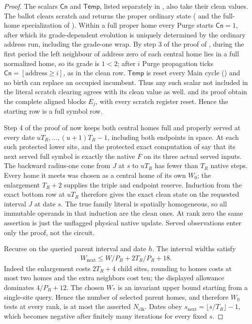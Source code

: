 \begin{proof}
The scalars \(\mathsf{Cn}\) and \(\mathsf{Temp}\), listed separately in \cite[Section~\ref*{cl:sec:native}]{DMNoise1D2026}, also take their clean values. The ballot clears scratch and returns the proper ordinary state (\cite[Section~\ref*{cl:sec:verifier}]{DMNoise1D2026} and the full-home specialization of \cite[Lemma~\ref*{cl:lem:endpoint}]{DMNoise1D2026}). Within a full proper home every Purge starts \(\mathsf{Cn}=1\), after which its grade-dependent evolution is uniquely determined by the ordinary address run, including the grade-one wrap. By step 3 of the proof of \cite[Lemma~\ref*{cl:lem:two-period}]{DMNoise1D2026}, during the first period the left neighbour of address zero of each central home lies in a full normalized home, so its grade is \(1 < 2\); after \(i\) Purge propagation ticks \(\mathsf{Cn}=[\mathrm{address} \ge i]\), as in the clean row. \(\mathsf{Temp}\) is reset every Main cycle (\cite[Section~\ref*{cl:sec:clock}]{DMNoise1D2026}) and no birth can replace an occupied incumbent. Thus any such scalar not included in the literal scratch clearing agrees with its clean value as well. \cite[Lemma~\ref*{cl:lem:clean}]{DMNoise1D2026} and its proof obtain the complete aligned blocks \(E_j\), with every scratch register reset. Hence the starting row is a full symbol row.

Step 4 of the proof of \cite[Lemma~\ref*{cl:lem:two-period}]{DMNoise1D2026} now keeps both central homes full and properly served at every date \(uT_{R},\dots,(u+1)T_{R}-1\), including both endpoints in space. At each such protected lower site, \cite[Lemma~\ref*{cl:lem:endpoint}]{DMNoise1D2026} and the protected exact computation of \cite[Proposition~\ref*{cl:prop:organization}]{DMNoise1D2026} say that its next served full symbol is exactly the native \(F\) on its three actual served inputs. The backward radius-one cone from \(J\) at \(s\) to \(uT_{R}\) has fewer than \(T_{R}\) native steps. Every home it meets was chosen as a central home of its own \(W_0\); the enlargement \(T_{R}+2\) supplies the triple and endpoint reserve. Induction from the exact bottom row at \(uT_{R}\) therefore gives the exact clean state on the requested interval \(J\) at date \(s\). The true family literal is spatially homogeneous, so all immutable operands in that induction are the clean ones. At rank zero the same assertion is just the unflagged physical native update. Served observations enter only the proof, not the circuit.

Recurse on the queried parent interval and date \(h\). The interval widths satisfy
\[
\begin{gathered}
W_{\mathrm{next}} \le  W/P_{R} + 2T_{R}/P_{R} + 18.
\end{gathered}
\]
Indeed the enlargement costs \(2T_{R}+4\) child sites, rounding to homes costs at most two homes and the extra neighbors cost ten; the displayed allowance dominates \(4/P_{R}+12\). The chosen \(W_{*}\) is an invariant upper bound starting from a single-site query. Hence the number of selected parent homes, and therefore \(W_0\) tests at every rank, is at most the asserted \(N_{\mathrm{clk}}\). Dates obey \(s_{\mathrm{next}}=\lfloor s/T_{R}\rfloor-1\), which becomes negative after finitely many iterations for every fixed \(s\).


\end{proof}
